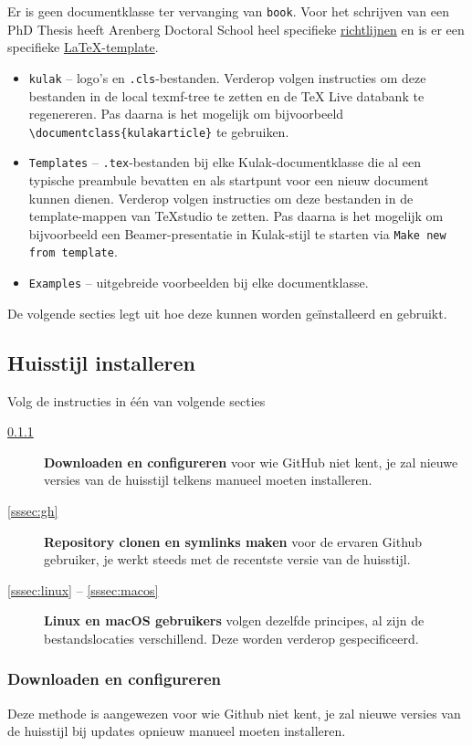\documentclass[kulak]{kulakarticle} %
\begin{document}
Er is geen documentklasse ter vervanging van \texttt{book}. Voor het schrijven van een PhD Thesis heeft Arenberg Doctoral School heel specifieke \href{https://set.kuleuven.be/intranet-associatie/ADS/guidelines_PhDthesis.htm}{richtlijnen} en is er een specifieke \href{https://people.cs.kuleuven.be/~wannes.meert/adsphd/}{\LaTeX-template}.

\begin{itemize}
	\item \texttt{kulak} -- logo's en \texttt{.cls}-bestanden. Verderop volgen instructies om deze bestanden in de local texmf-tree te zetten en de TeX Live databank te regenereren. Pas daarna is het mogelijk om bijvoorbeeld \verb+\documentclass{kulakarticle}+ te gebruiken.
	\item \texttt{Templates}  -- \texttt{.tex}-bestanden bij elke Kulak-documentklasse die al een typische preambule bevatten en als startpunt voor een nieuw document kunnen dienen. Verderop volgen instructies om deze bestanden in de  template-mappen van TeXstudio te zetten. Pas daarna is het mogelijk om bijvoorbeeld een Beamer-presentatie in Kulak-stijl te starten via \texttt{Make new from template}.
	\item \texttt{Examples} -- uitgebreide voorbeelden bij elke documentklasse.
\end{itemize}
De volgende secties legt uit hoe deze kunnen worden geïnstalleerd en gebruikt.

\subsection{Huisstijl installeren}
Volg de instructies in één van volgende secties
\begin{description}
	\item[\ref{sssec:dl}] \textbf{Downloaden en configureren} voor wie GitHub niet kent, je zal nieuwe versies van de huisstijl telkens manueel moeten installeren.
	\item[\ref{sssec:gh}] \textbf{Repository clonen en symlinks maken} voor de ervaren Github gebruiker, je werkt steeds met de recentste versie van de huisstijl.
	\item[\ref{sssec:linux} -- \ref{sssec:macos}] \textbf{Linux en macOS gebruikers} volgen dezelfde principes, al zijn de bestandslocaties verschillend. Deze worden verderop gespecificeerd.
\end{description}


\subsubsection{Downloaden en configureren}
\label{sssec:dl}
Deze methode is aangewezen voor wie Github niet kent, je zal nieuwe versies van de huisstijl bij updates opnieuw manueel moeten installeren.
\end{document}
